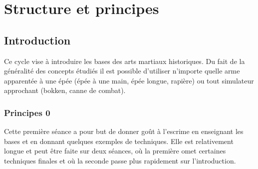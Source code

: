 \section{Structure et principes}


\subsection{Introduction}


Ce cycle vise à introduire les bases des arts martiaux historiques.
Du fait de la généralité des concepts étudiés il est possible d'utiliser n'importe quelle arme apparentée à une épée (épée à une main, épée longue, rapière) ou tout simulateur approchant (bokken, canne de combat).


\subsubsection{Principes 0}


Cette première séance a pour but de donner goût à l'escrime en enseignant les bases et en donnant quelques exemples de techniques.
Elle est relativement longue et peut être faite sur deux séances, où la première omet certaines techniques finales et où la seconde passe plus rapidement sur l'introduction.


